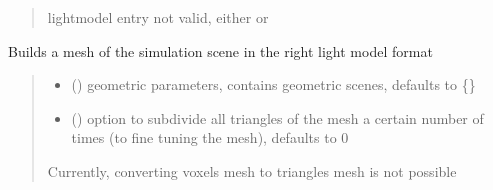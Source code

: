 \documentclass[letterpaper,10pt,english]{sphinxmanual}
\begin{document}
\begin{fulllineitems}
\begin{quote}
\begin{description}
\begin{itemize}
\end{itemize}

\sphinxAtStartPar
{} \textendash{} lightmodel entry not valid, either  or 

\end{description}\end{quote}

\begin{fulllineitems}
\label{\detokenize{reference:LVM.LightVegeManager.build}}
\pysigstartsignatures
{}
\pysigstopsignatures
\sphinxAtStartPar
Builds a mesh of the simulation scene in the right light model format
\begin{quote}\begin{description}
\begin{itemize}
\item {} 
\sphinxAtStartPar
{} (\sphinxstyleliteralemphasis{\sphinxupquote{, }}) \textendash{} geometric parameters, contains geometric scenes, defaults to \{\}

\item {} 
\sphinxAtStartPar
{} (\sphinxstyleliteralemphasis{\sphinxupquote{, }}) \textendash{} option to subdivide all triangles of the mesh a certain number of times (to fine tuning the mesh), defaults to 0

\end{itemize}

\sphinxAtStartPar
{} \textendash{} Currently, converting voxels mesh to triangles mesh is not possible

\end{description}\end{quote}


\end{fulllineitems}
\end{fulllineitems}
\end{document}
